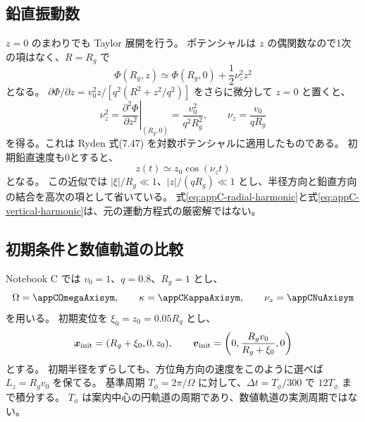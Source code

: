 \subsection{鉛直振動数}

$z=0$ のまわりでも Taylor 展開を行う。
ポテンシャルは $z$ の偶関数なので1次の項はなく、$R=R_g$ で
\begin{equation}
 \Phi(R_g,z)\simeq\Phi(R_g,0)+\frac12\nu_z^2z^2
\end{equation}
となる。
$\partial\Phi/\partial z=v_0^2z/[q^2(R^2+z^2/q^2)]$ をさらに微分して $z=0$ と置くと、
\begin{equation}
 \nu_z^2=\left.\frac{\partial^2\Phi}{\partial z^2}\right|_{(R_g,0)}
 =\frac{v_0^2}{q^2R_g^2},\qquad
 \boxed{\nu_z=\frac{v_0}{qR_g}}
\label{eq:appC-nuz}
\end{equation}
を得る。これは Ryden 式(7.47) を対数ポテンシャルに適用したものである\cite{ryden2025}。
初期鉛直速度も0とすると、
\begin{equation}
 z(t)\simeq z_0\cos(\nu_z t)
\label{eq:appC-vertical-harmonic}
\end{equation}
となる。
この近似では $|\xi|/R_g\ll1$、$|z|/(qR_g)\ll1$ とし、半径方向と鉛直方向の結合を高次の項として省いている。
式\eqref{eq:appC-radial-harmonic}と式\eqref{eq:appC-vertical-harmonic}は、元の運動方程式の厳密解ではない。

\subsection{初期条件と数値軌道の比較}

Notebook C では $v_0=1$、$q=0.8$、$R_g=1$ とし、
\begin{equation}
 \Omega=\appCOmegaAxisym,\qquad
 \kappa=\appCKappaAxisym,\qquad
 \nu_z=\appCNuAxisym
\end{equation}
を用いる。
初期変位を $\xi_0=z_0=0.05R_g$ とし、
\begin{equation}
 \boldsymbol x_{\rm init}=(R_g+\xi_0,0,z_0),\qquad
 \boldsymbol v_{\rm init}=\left(0,\frac{R_gv_0}{R_g+\xi_0},0\right)
\label{eq:appC-axisym-initial}
\end{equation}
とする。
初期半径をずらしても、方位角方向の速度をこのように選べば $L_z=R_gv_0$ を保てる。
基準周期 $T_\phi=2\pi/\Omega$ に対して、$\Delta t=T_\phi/300$ で $12T_\phi$ まで積分する。
$T_\phi$ は案内中心の円軌道の周期であり、数値軌道の実測周期ではない。

